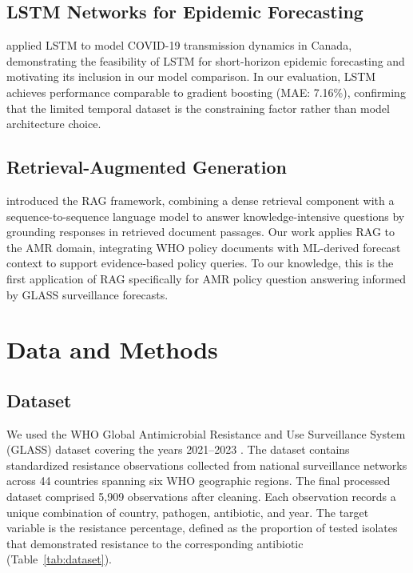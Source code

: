 \documentclass[12pt]{article}
\begin{document}
\subsection{LSTM Networks for Epidemic Forecasting}

\citet{chimmula2020} applied LSTM to model COVID-19 transmission dynamics in Canada, demonstrating the feasibility of LSTM for short-horizon epidemic forecasting and motivating its inclusion in our model comparison. In our evaluation, LSTM achieves performance comparable to gradient boosting (MAE: 7.16\%), confirming that the limited temporal dataset is the constraining factor rather than model architecture choice.

\subsection{Retrieval-Augmented Generation}

\citet{lewis2020} introduced the RAG framework, combining a dense retrieval component with a sequence-to-sequence language model to answer knowledge-intensive questions by grounding responses in retrieved document passages. Our work applies RAG to the AMR domain, integrating WHO policy documents with ML-derived forecast context to support evidence-based policy queries. To our knowledge, this is the first application of RAG specifically for AMR policy question answering informed by GLASS surveillance forecasts.

\section{Data and Methods}

\subsection{Dataset}

We used the WHO Global Antimicrobial Resistance and Use Surveillance System (GLASS) dataset covering the years 2021--2023 \citep{who2022glass, who2023manual}. The dataset contains standardized resistance observations collected from national surveillance networks across 44 countries spanning six WHO geographic regions. The final processed dataset comprised 5,909 observations after cleaning. Each observation records a unique combination of country, pathogen, antibiotic, and year. The target variable is the resistance percentage, defined as the proportion of tested isolates that demonstrated resistance to the corresponding antibiotic (Table~\ref{tab:dataset}).
\end{document}
